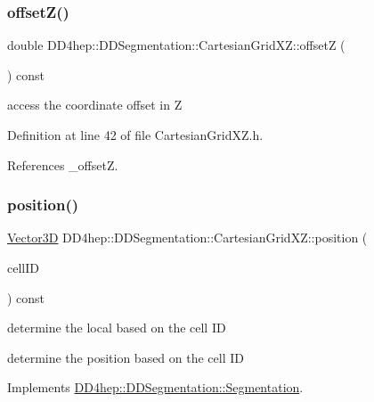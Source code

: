 \subsubsection{\texorpdfstring{offset\+Z()}{offsetZ()}}
{\footnotesize\ttfamily double D\+D4hep\+::\+D\+D\+Segmentation\+::\+Cartesian\+Grid\+X\+Z\+::offsetZ (\begin{DoxyParamCaption}{ }\end{DoxyParamCaption}) const\hspace{0.3cm}{\ttfamily [inline]}}



access the coordinate offset in Z 



Definition at line 42 of file Cartesian\+Grid\+X\+Z.\+h.



References \+\_\+offsetZ.

\hypertarget{class_d_d4hep_1_1_d_d_segmentation_1_1_cartesian_grid_x_z_a8ed53ce402a08aedea07c6a015abb0e8}{}\label{class_d_d4hep_1_1_d_d_segmentation_1_1_cartesian_grid_x_z_a8ed53ce402a08aedea07c6a015abb0e8} 
\subsubsection{\texorpdfstring{position()}{position()}}
{\footnotesize\ttfamily \hyperlink{struct_d_d4hep_1_1_d_d_segmentation_1_1_vector3_d}{Vector3D} D\+D4hep\+::\+D\+D\+Segmentation\+::\+Cartesian\+Grid\+X\+Z\+::position (\begin{DoxyParamCaption}\item[{const \hyperlink{namespace_d_d4hep_1_1_d_d_segmentation_ac7af071d85cb48820914434a07e21ba1}{Cell\+ID} \&}]{cell\+ID }\end{DoxyParamCaption}) const\hspace{0.3cm}{\ttfamily [virtual]}}



determine the local based on the cell ID 

determine the position based on the cell ID 

Implements \hyperlink{class_d_d4hep_1_1_d_d_segmentation_1_1_segmentation_a594fe6d78667415855858d083b64acad}{D\+D4hep\+::\+D\+D\+Segmentation\+::\+Segmentation}.



